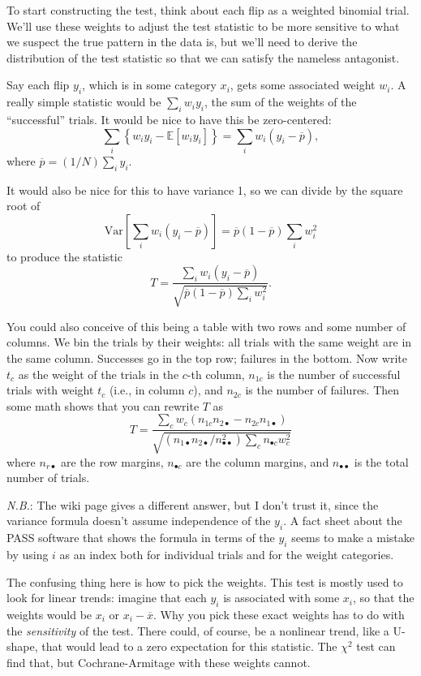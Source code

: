 \documentclass{book}
\begin{document}
To start constructing the test, think about each flip as a weighted
binomial trial. We'll use these weights to adjust the test statistic to
be more sensitive to what we suspect the true pattern in the data is,
but we'll need to derive the distribution of the test statistic so that
we can satisfy the nameless antagonist.

Say each flip \(y_i\), which is in some category \(x_i\), gets some
associated weight \(w_i\). A really simple statistic would be
\(\sum_i w_i y_i\), the sum of the weights of the ``successful'' trials.
It would be nice to have this be zero-centered: \[
\sum_i \left\{ w_i y_i - \mathbb{E}\left[ w_i y_i \right] \right\} = \sum_i w_i (y_i - \overline{p}),
\] where \(\overline{p} = (1/N)\sum_i y_i\).

It would also be nice for this to have variance 1, so we can divide by
the square root of \[
\mathrm{Var}\left[ \sum_i w_i (y_i - \overline{p}) \right] = \overline{p} (1-\overline{p}) \sum_i w_i^2
\] to produce the statistic \[
T = \frac{\sum_i w_i (y_i - \overline{p})}{\sqrt{\overline{p} (1-\overline{p}) \sum_i w_i^2}}.
\]

You could also conceive of this being a table with two rows and some
number of columns. We bin the trials by their weights: all trials with
the same weight are in the same column. Successes go in the top row;
failures in the bottom. Now write \(t_c\) as the weight of the trials in
the \(c\)-th column, \(n_{1c}\) is the number of successful trials with
weight \(t_c\) (i.e., in column \(c\)), and \(n_{2c}\) is the number of
failures. Then some math shows that you can rewrite \(T\) as \[
T = \frac{\sum_c w_c (n_{1c} n_{2\bullet} - n_{2c} n_{1\bullet})}{\sqrt{(n_{1\bullet} n_{2\bullet} / n_{\bullet\bullet}^2) \sum_c n_{\bullet c} w_c^2}}
\] where \(n_{r\bullet}\) are the row margins, \(n_{\bullet c}\) are the
column margins, and \(n_{\bullet\bullet}\) is the total number of
trials.

\emph{N.B.}: The wiki page gives a different answer, but I don't trust
it, since the variance formula doesn't assume independence of the
\(y_i\). A fact sheet about the PASS software that shows the formula in
terms of the \(y_i\) seems to make a mistake by using \(i\) as an index
both for individual trials and for the weight categories.

The confusing thing here is how to pick the weights. This test is mostly
used to look for linear trends: imagine that each \(y_i\) is associated
with some \(x_i\), so that the weights would be \(x_i\) or
\(x_i - \overline{x}\). Why you pick these exact weights has to do with
the \emph{sensitivity} of the test. There could, of course, be a
nonlinear trend, like a U-shape, that would lead to a zero expectation
for this statistic. The \(\chi^2\) test can find that, but
Cochrane-Armitage with these weights cannot.
\end{document}
